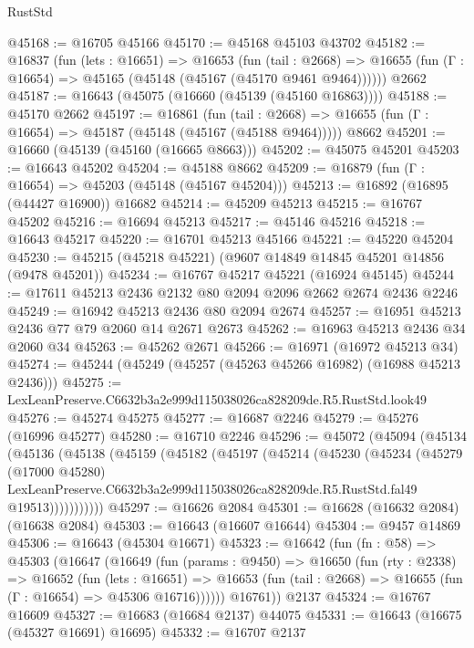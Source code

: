 \begin{lexlean}{RustStd}
\begin{coremodule}
@45168 := @16705 @45166
@45170 := @45168 @45103 @43702
@45182 := @16837
    (fun (lets : @16651) =>
    @16653
      (fun (tail : @2668) =>
      @16655 (fun (Γ : @16654) => @45165 (@45148 (@45167 (@45170 @9461 @9464))))))
    @2662
@45187 := @16643 (@45075 (@16660 (@45139 (@45160 @16863))))
@45188 := @45170 @2662
@45197 := @16861
    (fun (tail : @2668) => @16655 (fun (Γ : @16654) => @45187 (@45148 (@45167 (@45188 @9464)))))
    @8662
@45201 := @16660 (@45139 (@45160 (@16665 @8663)))
@45202 := @45075 @45201
@45203 := @16643 @45202
@45204 := @45188 @8662
@45209 := @16879 (fun (Γ : @16654) => @45203 (@45148 (@45167 @45204)))
@45213 := @16892 (@16895 (@44427 @16900)) @16682
@45214 := @45209 @45213
@45215 := @16767 @45202
@45216 := @16694 @45213
@45217 := @45146 @45216
@45218 := @16643 @45217
@45220 := @16701 @45213 @45166
@45221 := @45220 @45204
@45230 := @45215 (@45218 @45221) (@9607 @14849 @14845 @45201 @14856 (@9478 @45201))
@45234 := @16767 @45217 @45221 (@16924 @45145)
@45244 := @17611 @45213 @2436 @2132 @80 @2094 @2096 @2662 @2674 @2436 @2246
@45249 := @16942 @45213 @2436 @80 @2094 @2674
@45257 := @16951 @45213 @2436 @77 @79 @2060 @14 @2671 @2673
@45262 := @16963 @45213 @2436 @34 @2060 @34
@45263 := @45262 @2671
@45266 := @16971 (@16972 @45213 @34)
@45274 := @45244 (@45249 (@45257 (@45263 @45266 @16982) (@16988 @45213 @2436)))
@45275 := LexLeanPreserve.C6632b3a2e999d115038026ca828209de.R5.RustStd.look49
@45276 := @45274 @45275
@45277 := @16687 @2246
@45279 := @45276 (@16996 @45277)
@45280 := @16710 @2246
@45296 := @45072
    (@45094
      (@45134
        (@45136
          (@45138
            (@45159
              (@45182
                (@45197
                  (@45214
                    (@45230
                      (@45234
                        (@45279
                          (@17000 @45280)
                          LexLeanPreserve.C6632b3a2e999d115038026ca828209de.R5.RustStd.fal49
                          @19513)))))))))))
@45297 := @16626 @2084
@45301 := @16628 (@16632 @2084) (@16638 @2084)
@45303 := @16643 (@16607 @16644)
@45304 := @9457 @14869
@45306 := @16643 (@45304 @16671)
@45323 := @16642
    (fun (fn : @58) =>
    @45303
      (@16647
        (@16649
          (fun (params : @9450) =>
          @16650
            (fun (rty : @2338) =>
            @16652
              (fun (lets : @16651) =>
              @16653 (fun (tail : @2668) => @16655 (fun (Γ : @16654) => @45306 @16716))))))
        @16761))
    @2137
@45324 := @16767 @16609
@45327 := @16683 (@16684 @2137) @44075
@45331 := @16643 (@16675 (@45327 @16691) @16695)
@45332 := @16707 @2137

\end{coremodule}
\end{lexlean}
